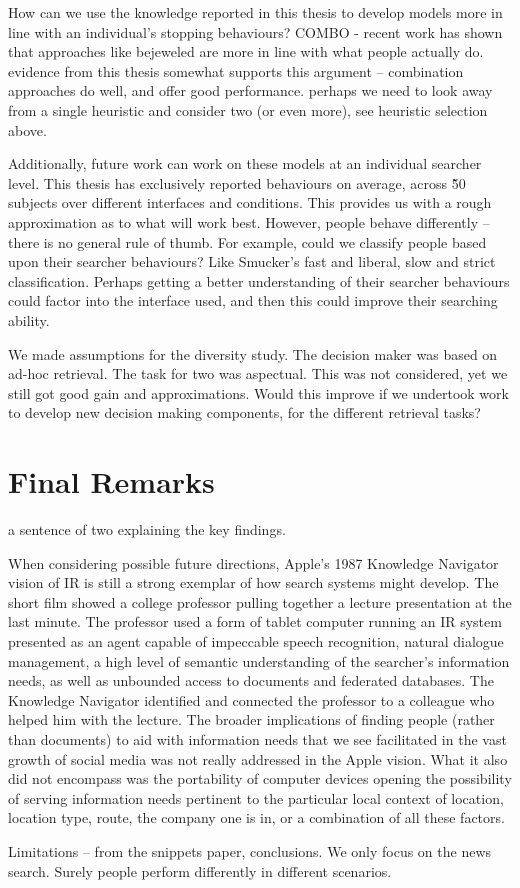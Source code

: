 How can we use the knowledge reported in this thesis to develop models more in line with an individual's stopping behaviours?
COMBO - recent work has shown that approaches like bejeweled are more in line with what people actually do. evidence from this thesis somewhat supports this argument -- combination approaches do well, and offer good performance. perhaps we need to look away from a single heuristic and consider two (or even more), see heuristic selection above.

Additionally, future work can work on these models at an individual searcher level. This thesis has exclusively reported behaviours on average, across \~ 50 subjects over different interfaces and conditions. This provides us with a rough approximation as to what will work best. However, people behave differently -- there is no general rule of thumb. For example, could we classify people based upon their searcher behaviours? Like Smucker's fast and liberal, slow and strict classification. Perhaps getting a better understanding of their searcher behaviours could factor into the interface used, and then this could improve their searching ability.

We made assumptions for the diversity study. The decision maker was based on ad-hoc retrieval.
The task for two was aspectual. This was not considered, yet we still got good gain and approximations. Would this improve if we undertook work to develop new decision making components, for the different retrieval tasks?


\section{Final Remarks}
a sentence of two explaining the key findings.



When considering possible future directions, Apple’s 1987 Knowledge Navigator vision of IR is still a strong exemplar of how search systems might develop. The short film showed a college professor pulling together a lecture presentation at the last minute. The professor used a form of tablet computer running an IR system presented as an agent capable of impeccable speech recognition, natural dialogue management, a high level of semantic understanding of the searcher’s information needs, as well as unbounded access to documents and federated databases.
The Knowledge Navigator identified and connected the professor to a colleague who helped him with the lecture. The broader implications of finding people (rather than documents) to aid with information needs that we see facilitated in the vast growth of social media was not really addressed in the Apple vision. What it also did not encompass was the portability of computer devices opening the possibility of serving information needs pertinent to the particular local context of location, location type, route, the company one is in, or a combination of all these factors. 



Limitations -- from the snippets paper, conclusions. We only focus on the news search. Surely people perform differently in different scenarios.